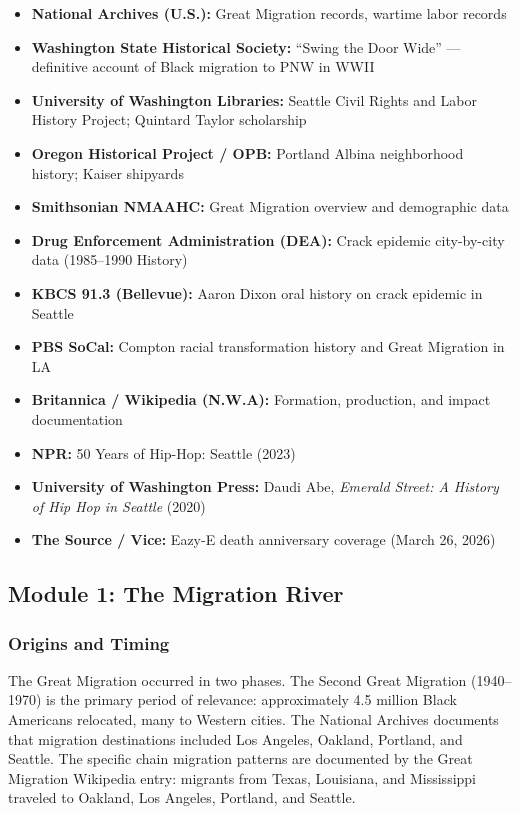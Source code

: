 \documentclass[11pt,letterpaper]{article}
\begin{document}
\begin{itemize}[leftmargin=1.5em]
  \item \textbf{National Archives (U.S.):} Great Migration records, wartime labor records
  \item \textbf{Washington State Historical Society:} ``Swing the Door Wide'' --- definitive account of Black migration to PNW in WWII
  \item \textbf{University of Washington Libraries:} Seattle Civil Rights and Labor History Project; Quintard Taylor scholarship
  \item \textbf{Oregon Historical Project / OPB:} Portland Albina neighborhood history; Kaiser shipyards
  \item \textbf{Smithsonian NMAAHC:} Great Migration overview and demographic data
  \item \textbf{Drug Enforcement Administration (DEA):} Crack epidemic city-by-city data (1985--1990 History)
  \item \textbf{KBCS 91.3 (Bellevue):} Aaron Dixon oral history on crack epidemic in Seattle
  \item \textbf{PBS SoCal:} Compton racial transformation history and Great Migration in LA
  \item \textbf{Britannica / Wikipedia (N.W.A):} Formation, production, and impact documentation
  \item \textbf{NPR:} 50 Years of Hip-Hop: Seattle (2023)
  \item \textbf{University of Washington Press:} Daudi Abe, \textit{Emerald Street: A History of Hip Hop in Seattle} (2020)
  \item \textbf{The Source / Vice:} Eazy-E death anniversary coverage (March 26, 2026)
\end{itemize}

\subsection{Module 1: The Migration River}

\subsubsection{Origins and Timing}

The Great Migration occurred in two phases. The Second Great Migration (1940--1970) is the primary period of relevance: approximately 4.5 million Black Americans relocated, many to Western cities. The National Archives documents that migration destinations included Los Angeles, Oakland, Portland, and Seattle. The specific chain migration patterns are documented by the Great Migration Wikipedia entry: migrants from Texas, Louisiana, and Mississippi traveled to Oakland, Los Angeles, Portland, and Seattle.
\end{document}
